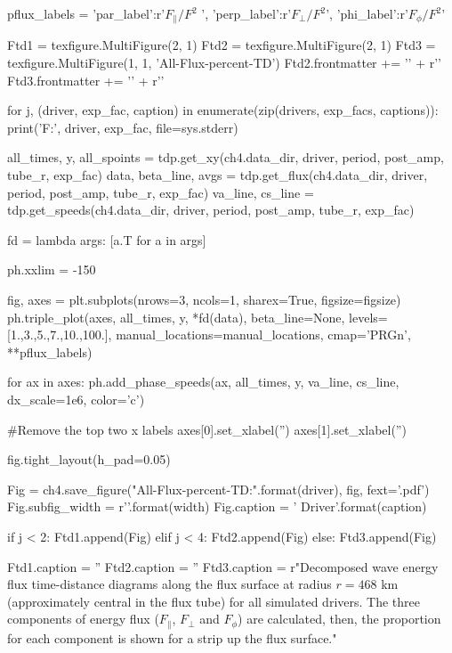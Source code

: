 \begin{pycode}[chapter4]
pflux_labels = {'par_label':r'$F_\parallel / F^2$ ', 
                'perp_label':r'$F_\perp / F^2$',
                'phi_label':r'$F_\phi / F^2$'}

Ftd1 = texfigure.MultiFigure(2, 1)
Ftd2 = texfigure.MultiFigure(2, 1)
Ftd3 = texfigure.MultiFigure(1, 1, 'All-Flux-percent-TD')
Ftd2.frontmatter += '\n' + r'\ContinuedFloat'
Ftd3.frontmatter += '\n' + r'\ContinuedFloat'

for j, (driver, exp_fac, caption) in enumerate(zip(drivers, exp_facs, captions)):
    print('F:', driver, exp_fac, file=sys.stderr)
    
    
    all_times, y, all_spoints = tdp.get_xy(ch4.data_dir, driver, period, post_amp, tube_r, exp_fac)
    data, beta_line, avgs = tdp.get_flux(ch4.data_dir, driver, period, post_amp, tube_r, exp_fac)
    va_line, cs_line = tdp.get_speeds(ch4.data_dir, driver, period, post_amp, tube_r, exp_fac)
    
    
    fd = lambda args: [a.T for a in args]
    
    ph.xxlim = -150
    
    fig, axes = plt.subplots(nrows=3, ncols=1, sharex=True, figsize=figsize)
    ph.triple_plot(axes, all_times, y, *fd(data), beta_line=None,
    levels=[1.,3.,5.,7.,10.,100.], manual_locations=manual_locations, cmap='PRGn', **pflux_labels)
    
    for ax in axes:
        ph.add_phase_speeds(ax, all_times, y, va_line, cs_line, dx_scale=1e6, color='c')
    
    #Remove the top two x labels
    axes[0].set_xlabel('')
    axes[1].set_xlabel('')
    
    fig.tight_layout(h_pad=0.05)
    
    Fig = ch4.save_figure("All-Flux-percent-TD:{}".format(driver), fig, fext='.pdf')
    Fig.subfig_width = r'{}\columnwidth'.format(width)
    Fig.caption = '{} Driver'.format(caption)
    
    if j < 2:
        Ftd1.append(Fig)
    elif j < 4:
        Ftd2.append(Fig)
    else:
        Ftd3.append(Fig)


Ftd1.caption = ''
Ftd2.caption = ''
Ftd3.caption = r"Decomposed wave energy flux time-distance diagrams along the flux surface at radius $r = 468$ km (approximately central in the flux tube) for all simulated drivers. The three components of energy flux ($F_\parallel$, $F_\perp$ and $F_\phi$) are calculated, then, the proportion for each component is shown for a strip up the flux surface."
\end{pycode}

